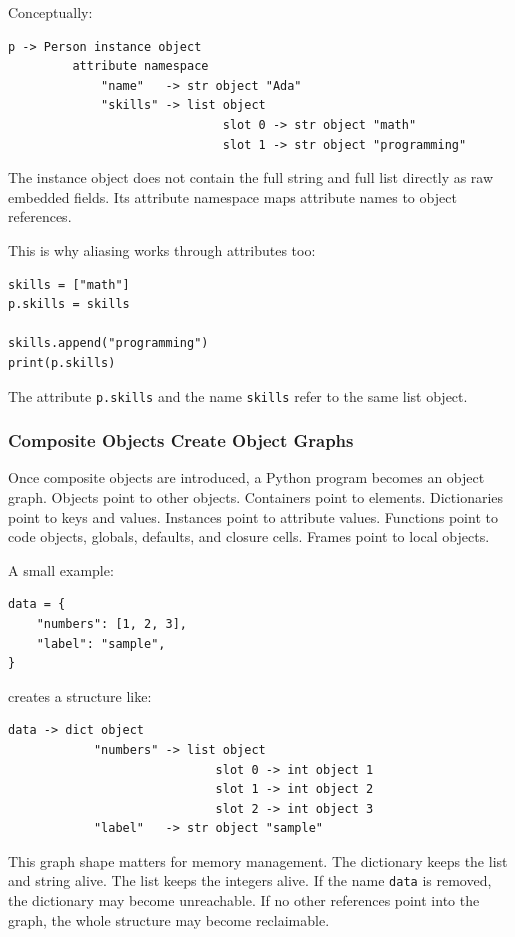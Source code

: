 Conceptually:

\begin{verbatim}
p -> Person instance object
         attribute namespace
             "name"   -> str object "Ada"
             "skills" -> list object
                              slot 0 -> str object "math"
                              slot 1 -> str object "programming"
\end{verbatim}

The instance object does not contain the full string and full list directly as raw embedded fields. Its attribute namespace maps attribute names to object references.

This is why aliasing works through attributes too:

\begin{verbatim}
skills = ["math"]
p.skills = skills

skills.append("programming")
print(p.skills)
\end{verbatim}

The attribute \texttt{p.skills} and the name \texttt{skills} refer to the same list object.

\subsubsection*{Composite Objects Create Object Graphs}

Once composite objects are introduced, a Python program becomes an object graph. Objects point to other objects. Containers point to elements. Dictionaries point to keys and values. Instances point to attribute values. Functions point to code objects, globals, defaults, and closure cells. Frames point to local objects.

A small example:

\begin{verbatim}
data = {
    "numbers": [1, 2, 3],
    "label": "sample",
}
\end{verbatim}

creates a structure like:

\begin{verbatim}
data -> dict object
            "numbers" -> list object
                             slot 0 -> int object 1
                             slot 1 -> int object 2
                             slot 2 -> int object 3
            "label"   -> str object "sample"
\end{verbatim}

This graph shape matters for memory management. The dictionary keeps the list and string alive. The list keeps the integers alive. If the name \texttt{data} is removed, the dictionary may become unreachable. If no other references point into the graph, the whole structure may become reclaimable.

